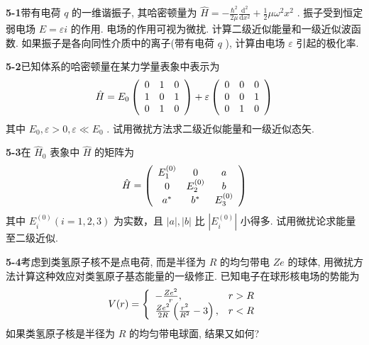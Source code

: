\textbf{5-1}\quad 带有电荷 $q$ 的一维谐振子, 其哈密顿量为 $\hat{H} = -\frac{\hbar^2}{2\mu}\frac{\mathrm{d}^2}{\mathrm{d}x^2} + \frac{1}{2}\mu \omega^2 x^2$ . 振子受到恒定弱电场 $E = \varepsilon i$ 的作用. 电场的作用可视为微扰. 计算二级近似能量和一级近似波函数. 如果振子是各向同性介质中的离子(带有电荷 $q$ ), 计算由电场 $\varepsilon$ 引起的极化率.

\vfill

\newpage
\vfill

\noindent
\textbf{5-2}\quad 已知体系的哈密顿量在某力学量表象中表示为
$$
\hat {H} = E _ {0} \left( \begin{array}{c c c} 0 & 1 & 0 \\ 1 & 0 & 1 \\ 0 & 1 & 0 \end{array} \right) + \varepsilon \left( \begin{array}{c c c} 0 & 0 & 0 \\ 0 & 0 & 1 \\ 0 & 1 & 0 \end{array} \right)
$$
其中 $E_0, \varepsilon > 0, \varepsilon \ll E_0$ . 试用微扰方法求二级近似能量和一级近似态矢.

\vfill

\newpage
\vfill

\noindent
\textbf{5-3}\quad 在 $\hat{H}_0$ 表象中 $\hat{H}$ 的矩阵为
$$
\hat {H} = \left( \begin{array}{c c c} E _ {1} ^ {(0)} & 0 & a \\ 0 & E _ {2} ^ {(0)} & b \\ a ^ {*} & b ^ {*} & E _ {3} ^ {(0)} \end{array} \right)
$$
其中 $E_{i}^{(0)}(i = 1,2,3)$ 为实数，且 $\left|a\right|, \left|b\right|$ 比 $\left|E_{i}^{(0)}\right|$ 小得多. 试用微扰论求能量至二级近似.

\vfill

\newpage
\vfill

\noindent
\textbf{5-4}\quad 考虑到类氢原子核不是点电荷, 而是半径为 $R$ 的均匀带电 $Ze$ 的球体, 用微扰方法计算这种效应对类氢原子基态能量的一级修正. 已知电子在球形核电场的势能为
$$
V (r) = \left\{ \begin{array}{l l} - \frac {Z e ^ {2}}{r}, & r > R \\ \frac {Z e ^ {2}}{2 R} \left(\frac {r ^ {2}}{R ^ {2}} - 3\right), & r <   R \end{array} \right.
$$
如果类氢原子核是半径为 $R$ 的均匀带电球面, 结果又如何?

\vfill

